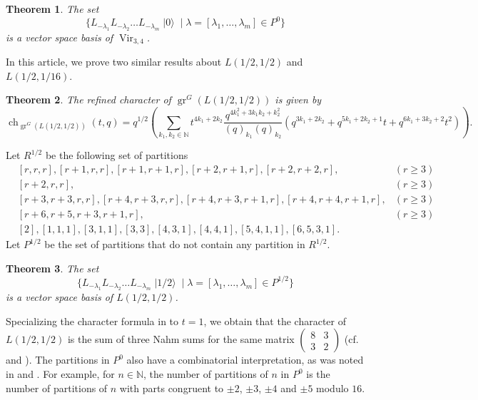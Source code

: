 \documentclass[a4paper, 12pt, reqno]{amsart}
\newtheorem{theorem}{Theorem}[section]
\theoremstyle{remark}
\DeclareMathOperator{\Vir}{Vir}
\DeclareMathOperator{\gr}{gr}
\DeclareMathOperator{\ch}{ch}
\DeclareMathOperator{\vac}{|0\rangle}
\DeclareMathOperator{\vachalf}{|1/2\rangle}
\begin{document}
\begin{theorem}
  \label{thr:2}
  The set
  \begin{equation*}
    \{L_{-\lambda_1}L_{-\lambda_2}\dots L_{-\lambda_m}\vac \mid \lambda = [\lambda_1, \dots, \lambda_m] \in P^0\}
  \end{equation*}
  is a vector space basis of $\Vir_{3, 4}$.
\end{theorem}

In this article, we prove two similar results about $L(1/2, 1/2)$ and $L(1/2, 1/16)$.

\begin{theorem}
  \label{thr:3}
  The refined character of $\gr^G(L(1/2, 1/2))$ is given by
  \begin{equation*}
    \ch_{\gr^G(L(1/2, 1/2))}(t, q) = q^{1/2}\left(\sum_{k_1, k_2 \in \mathbb{N}}t^{4k_1 + 2k_2}\frac{q^{4k_1^2 + 3k_1k_2 + k_2^2}}{(q)_{k_1}(q)_{k_2}}(q^{3k_1 + 2k_2} + q^{5k_1 + 2k_2 + 1}t + q^{6k_1 + 3k_2 + 2}t^2)\right).
  \end{equation*}
\end{theorem}

Let $R^{1/2}$ be the following set of partitions
\begin{align*}
  &[r, r, r], [r + 1, r, r], [r + 1, r + 1, r], [r + 2, r + 1, r], [r + 2, r + 2, r], &(r \ge 3) \\
  &[r + 2, r, r], &(r \ge 3) \\
  &[r + 3, r + 3, r, r], [r + 4, r + 3, r, r],  [r + 4, r + 3, r + 1, r], [r + 4, r + 4, r + 1, r], &(r \ge 3)\\
  &[r + 6, r + 5, r + 3, r + 1, r], &(r \ge 3) \\
  &[2], [1, 1, 1], [3, 1, 1], [3, 3], [4, 3, 1], [4, 4, 1], [5, 4, 1, 1], [6, 5, 3, 1].
\end{align*}
Let $P^{1/2}$ be the set of partitions that do not contain any partition in $R^{1/2}$.

\begin{theorem}
  \label{thr:4}
  The set
  \begin{equation*}
    \{L_{-\lambda_1}L_{-\lambda_2}\dots L_{-\lambda_m}\vachalf \mid \lambda = [\lambda_1, \dots, \lambda_m] \in P^{1/2}\}
  \end{equation*}
  is a vector space basis of $L(1/2, 1/2)$.
\end{theorem}

Specializing the character formula in  to $t = 1$, we obtain that the character of $L(1/2, 1/2)$ is the sum of three Nahm sums for the same matrix $\left(\begin{smallmatrix} 8 & 3 \\ 3 & 2 \end{smallmatrix}\right)$ (cf.\ \cite{Nahm2007} and \cite{andrews_singular_2022}).
The partitions in $P^0$ also have a combinatorial interpretation, as was noted in \cite{andrews_singular_2022} and \cite{tsuchioka_vertex_2023}.
For example, for $n \in \mathbb{N}$, the number of partitions of $n$ in $P^0$ is the number of partitions of $n$ with parts congruent to $\pm 2$, $\pm 3$, $\pm 4$ and $\pm 5$ modulo $16$.
\end{document}
